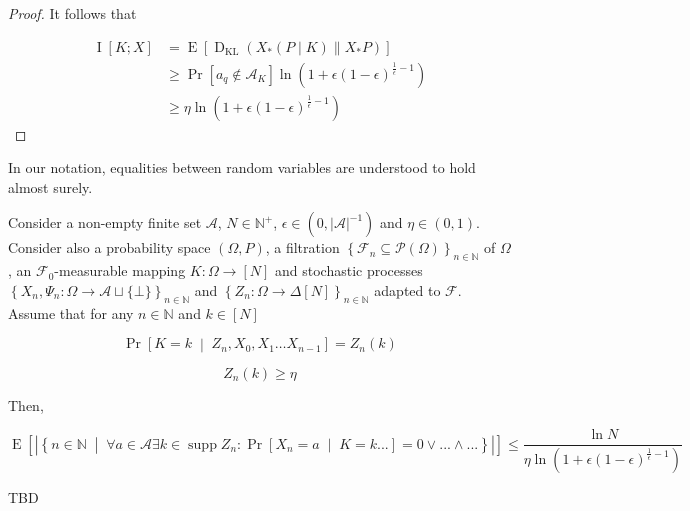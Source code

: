 \documentclass[anon,12pt]{colt2018} %
\DeclareMathOperator{\Supp}{supp}
\newcommand{\AP}[1]{\left(#1\right)}
\newcommand{\AB}[1]{\left[#1\right]}
\newcommand{\AC}[1]{\left\{#1\right\}}
\newcommand{\ABM}[2]{\left[#1\;\middle\vert\;#2\right]}
\newcommand{\ACM}[2]{\left\{#1\;\middle\vert\;#2\right\}}
\newcommand{\Pa}[2]{\underset{#1}{\operatorname{Pr}}\AB{#2}}
\newcommand{\CP}[3]{\underset{#1}{\operatorname{Pr}}\ABM{#2}{#3}}
\newcommand{\Ea}[2]{\underset{#1}{\operatorname{E}}\AB{#2}}
\newcommand{\Ia}[2]{\underset{#1}{\operatorname{I}}\AB{#2}}
\newcommand{\PS}[1]{\mathcal{P}\AP{#1}}
\newcommand{\KL}[2]{\operatorname{D}_{\mathrm{KL}}(#1 \| #2)}
\newcommand{\Nats}{\mathbb{N}}
\newcommand{\Abs}[1]{\left\vert #1 \right\vert}
\newcommand{\A}{\mathcal{A}}
\newcommand{\F}{\mathcal{F}}
\begin{document}
\begin{proof}
It follows that

\begin{align*}
\Ia{}{K;X} &= \Ea{}{\KL{X_*(P \mid K)}{X_* P}} \\ 
&\geq \Pa{}{a_q \not \in \A_K} \ln{\AP{1+\epsilon(1-\epsilon)^{\frac{1}{\epsilon}-1}}} \\
&\geq \eta \ln{\AP{1+\epsilon(1-\epsilon)^{\frac{1}{\epsilon}-1}}}
\end{align*}
\end{proof}

In our notation, equalities between random variables are understood to hold almost surely.

\begin{samepage}
\begin{proposition}
\label{prp:delegation}

Consider  a non-empty finite set $\A$, $N \in \Nats^+$, $\epsilon\in\AP{0,\Abs{\A}^{-1}}$ and $\eta\in(0,1)$. Consider also  a probability space $(\Omega,P)$, a filtration $\AC{\F_n \subseteq \PS{\Omega}}_{n\in\Nats}$ of $\Omega$, an $\F_0$-measurable mapping $K: \Omega \rightarrow [N]$ and stochastic processes $\AC{X_n,\Psi_n: \Omega \rightarrow \A \sqcup \{\bot\}}_{n \in \Nats}$ and $\AC{Z_n: \Omega \rightarrow \Delta[N]}_{n \in \Nats}$ adapted to $\F$. Assume that for any $n\in\Nats$ and $k\in[N]$

\begin{equation}
\CP{}{K = k}{Z_n,X_0,X_1 \dots X_{n-1}}=Z_n(k)
\end{equation}

\begin{equation}
Z_n(k) \geq \eta
\end{equation}

Then,

\begin{equation}
\Ea{}{\Abs{\ACM{n\in\Nats}{\forall a \in \A \exists k \in \Supp{Z_n}: \CP{}{X_n=a}{K=k...}=0 \lor ... \land ...}}} \leq \frac{\ln{N}}{\eta\ln{\AP{1+\epsilon(1-\epsilon)^{\frac{1}{\epsilon}-1}}}}
\end{equation}


TBD

\end{proposition}
\end{samepage}
\end{document}
